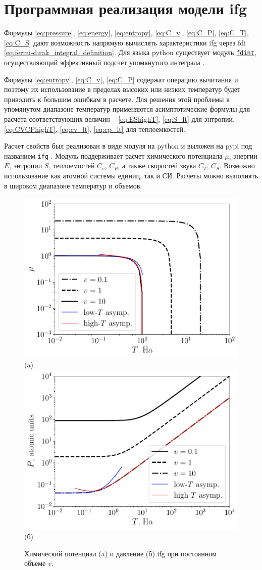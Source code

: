 \section{Программная реализация модели \texorpdfstring{\acrshort{ifg}}{ИФГ}}
Формулы \eqref{eq:pressure}, \eqref{eq:energy}, \eqref{eq:entropy}, \eqref{eq:C_v}, \eqref{eq:C_P}, \eqref{eq:C_T}, \eqref{eq:C_S} дают возможность напрямую вычислять характеристики \acrshort{ifg} через \gls{fdi} \eqref{eq:fermi-dirak_integral_definition}.
Для языка \gls{python} существует модуль \href{https://pypi.org/project/fdint}{\texttt{fdint}}, осуществляющий эффективный подсчет упомянутого интеграла \cite{fdint}.

Формулы \eqref{eq:entropy}, \eqref{eq:C_v}, \eqref{eq:C_P} содержат операцию вычитания и поэтому их использование в пределах высоких или низких температур будет приводить к большим ошибкам в расчете.
Для решения этой проблемы в упомянутом диапазоне температур применяются асимптотические формулы для расчета соответствующих величин -- \eqref{eq:EShighT}, \eqref{eq:S_lt} для энтропии, \eqref{eq:CVCPhighT}, \eqref{eq:cv_lt}, \eqref{eq:cp_lt} для теплоемкостей.

Расчет свойств был реализован в виде модуля на \gls{python} и выложен на \gls{pypi} под названием \texttt{ifg} \cite{ifgpy}.
Модуль поддерживает расчет химического потенциала $\mu$, энергии $E$, энтропии $S$, теплоемостей $C_v$, $C_P$, а также скоростей звука $C_T$, $C_S$.
Возможно использование как атомной системы единиц, так и СИ.
Расчеты можно выполнять в широком диапазоне температур и объемов.

\begin{figure}[!h]
    \hspace{-1cm}
  \includegraphics[width=0.5\columnwidth]{img/mu}(a)
  \includegraphics[width=0.5\columnwidth]{img/p}(б)
  \caption{Химический потенциал (a) и давление (б) \acrshort{ifg} при постоянном объеме $v$.}
  \label{fig:chemical_potential}
\end{figure}

